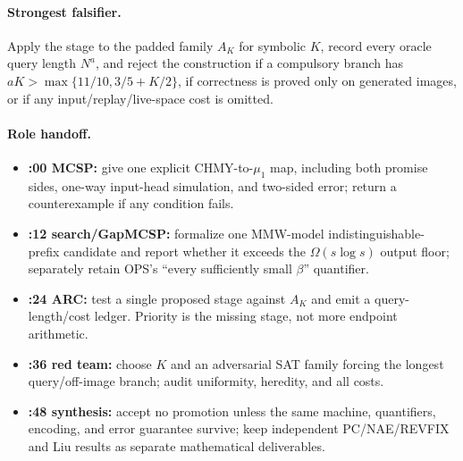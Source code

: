 \documentclass[11pt]{article}
\begin{document}
\paragraph{Strongest falsifier.}
Apply the stage to the padded family $A_K$ for symbolic $K$, record every oracle
query length $N^a$, and reject the construction if a compulsory branch has
$aK>\max\{11/10,3/5+K/2\}$, if correctness is proved only on generated images,
or if any input/replay/live-space cost is omitted.

\paragraph{Role handoff.}
\begin{itemize}[leftmargin=*]
  \item \textbf{:00 MCSP:} give one explicit CHMY-to-$\mu_1$ map, including
  both promise sides, one-way input-head simulation, and two-sided error; return
  a counterexample if any condition fails.
  \item \textbf{:12 search/GapMCSP:} formalize one MMW-model indistinguishable-
  prefix candidate and report whether it exceeds the $\Omega(s\log s)$ output
  floor; separately retain OPS's ``every sufficiently small $\beta$'' quantifier.
  \item \textbf{:24 ARC:} test a single proposed stage against $A_K$ and emit a
  query-length/cost ledger.  Priority is the missing stage, not more endpoint
  arithmetic.
  \item \textbf{:36 red team:} choose $K$ and an adversarial SAT family forcing
  the longest query/off-image branch; audit uniformity, heredity, and all costs.
  \item \textbf{:48 synthesis:} accept no promotion unless the same machine,
  quantifiers, encoding, and error guarantee survive; keep independent
  PC/NAE/REVFIX and Liu results as separate mathematical deliverables.
\end{itemize}
\end{document}

